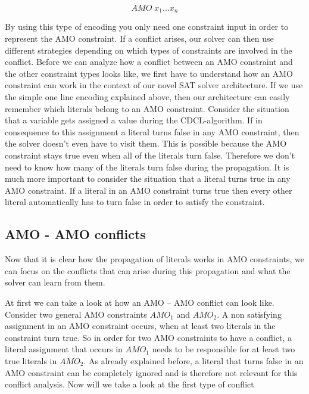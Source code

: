 \begin{leftbar}
\begin{displaymath}
AMO \; x_1 ... x_n
\end{displaymath}
\end{leftbar}
By using this type of encoding you only need one constraint input in order to represent the AMO constraint. If a conflict arises, our solver can then use different strategies depending on which types of constraints are involved in the conflict.
Before we can analyze how a conflict between an AMO constraint and the other constraint types looks like, we first have to understand how an AMO constraint can work in the context of our novel SAT solver architecture. If we use the simple one line encoding explained above, then our architecture can easily remember which literals belong to an AMO constraint. Consider the situation that a variable gets assigned a value during the CDCL-algorithm. If in consequence to this assignment a literal turns false in any AMO constraint, then the solver doesn’t even have to visit them. This is possible because the AMO constraint stays true even when all of the literals turn false. Therefore we don’t need to know how many of the literals turn false during the propagation. It is much more important to consider the situation that a literal turns true in any AMO constraint. If a literal in an AMO constraint turns true then every other literal automatically has to turn false in order to satisfy the constraint.

\subsection{AMO - AMO conflicts}

Now that it is clear how the propagation of literals works in AMO constraints, we can focus on the conflicts that can arise during this propagation and what the solver can learn from them.


At first we can take a look at how an AMO – AMO conflict can look like. Consider two general AMO constraints $AMO_1$ and $AMO_2$. A non satisfying assignment in an AMO constraint occurs, when at least two literals in the constraint turn true. So in order for two AMO constraints to have a conflict, a literal assignment that occurs in $AMO_1$ needs to be responsible for at least two true literals in $AMO_2$. As already explained before, a literal that turns false in an AMO constraint can be completely ignored and is therefore not relevant for this conflict analysis. Now will we take a look at the first type of conflict

